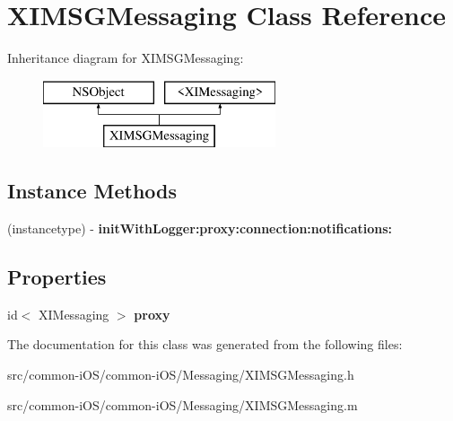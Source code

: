 \hypertarget{interface_x_i_m_s_g_messaging}{}\section{X\+I\+M\+S\+G\+Messaging Class Reference}
\label{interface_x_i_m_s_g_messaging}
Inheritance diagram for X\+I\+M\+S\+G\+Messaging\+:\begin{figure}[H]
\begin{center}
\leavevmode
\includegraphics[height=2.000000cm]{interface_x_i_m_s_g_messaging}
\end{center}
\end{figure}
\subsection*{Instance Methods}
\begin{DoxyCompactItemize}
\item 
\hypertarget{interface_x_i_m_s_g_messaging_a2ba3efb99eae8cd1c1f3898f6ee419d6}{}\label{interface_x_i_m_s_g_messaging_a2ba3efb99eae8cd1c1f3898f6ee419d6} 
(instancetype) -\/ {\bfseries init\+With\+Logger\+:proxy\+:connection\+:notifications\+:}
\end{DoxyCompactItemize}
\subsection*{Properties}
\begin{DoxyCompactItemize}
\item 
\hypertarget{interface_x_i_m_s_g_messaging_a9deae5c5d31fc7c3b250a650b73aab05}{}\label{interface_x_i_m_s_g_messaging_a9deae5c5d31fc7c3b250a650b73aab05} 
id$<$ X\+I\+Messaging $>$ {\bfseries proxy}
\end{DoxyCompactItemize}


The documentation for this class was generated from the following files\+:\begin{DoxyCompactItemize}
\item 
src/common-\/i\+O\+S/common-\/i\+O\+S/\+Messaging/X\+I\+M\+S\+G\+Messaging.\+h\item 
src/common-\/i\+O\+S/common-\/i\+O\+S/\+Messaging/X\+I\+M\+S\+G\+Messaging.\+m\end{DoxyCompactItemize}
